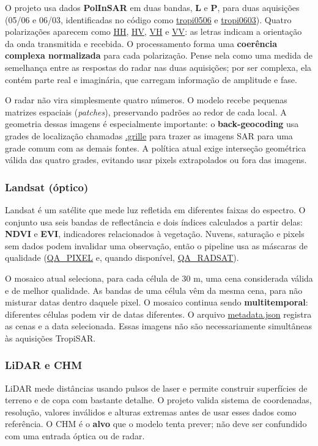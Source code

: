 \documentclass[11pt,a4paper]{article}
\begin{document}
O projeto usa dados \textbf{PolInSAR} em duas bandas, \textbf{L} e \textbf{P}, para duas aquisições (05/06 e 06/03, identificadas no código como \url{tropi0506} e \url{tropi0603}). Quatro polarizações aparecem como \url{HH}, \url{HV}, \url{VH} e \url{VV}: as letras indicam a orientação da onda transmitida e recebida. O processamento forma uma \textbf{coerência complexa normalizada} para cada polarização. Pense nela como uma medida de semelhança entre as respostas do radar nas duas aquisições; por ser complexa, ela contém parte real e imaginária, que carregam informação de amplitude e fase.

O radar não vira simplesmente quatro números. O modelo recebe pequenas matrizes espaciais (\emph{patches}), preservando padrões ao redor de cada local. A geometria dessas imagens é especialmente importante: o \textbf{back-geocoding} usa grades de localização chamadas \url{.grille} para trazer as imagens SAR para uma grade comum com as demais fontes. A política atual exige interseção geométrica válida das quatro grades, evitando usar pixels extrapolados ou fora das imagens.

\subsubsection{Landsat (óptico)}
Landsat é um satélite que mede luz refletida em diferentes faixas do espectro. O conjunto usa seis bandas de reflectância e dois índices calculados a partir delas: \textbf{NDVI} e \textbf{EVI}, indicadores relacionados à vegetação. Nuvens, saturação e pixels sem dados podem invalidar uma observação, então o pipeline usa as máscaras de qualidade (\url{QA_PIXEL} e, quando disponível, \url{QA_RADSAT}).

O mosaico atual seleciona, para cada célula de 30 m, uma cena considerada válida e de melhor qualidade. As bandas de uma célula vêm da mesma cena, para não misturar datas dentro daquele pixel. O mosaico continua sendo \textbf{multitemporal}: diferentes células podem vir de datas diferentes. O arquivo \url{metadata.json} registra as cenas e a data selecionada. Essas imagens não são necessariamente simultâneas às aquisições TropiSAR.

\subsubsection{LiDAR e CHM}
LiDAR mede distâncias usando pulsos de laser e permite construir superfícies de terreno e de copa com bastante detalhe. O projeto valida sistema de coordenadas, resolução, valores inválidos e alturas extremas antes de usar esses dados como referência. O CHM é o \textbf{alvo} que o modelo tenta prever; não deve ser confundido com uma entrada óptica ou de radar.
\end{document}
